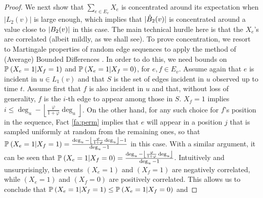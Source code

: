 \begin{proof}
We next show that $\sum_{e\in E_v}X_e$ is concentrated around its expectation when $|L_2(v)|$ is large enough, which implies that $|\hat{B}_2(v)|$ is concentrated around a value close to $|B_2(v)|$ in this case. The main technical hurdle here is that the $X_e$'s are correlated (albeit mildly, as we shall see). To prove concentration, we resort to Martingale properties of random edge sequences to apply the method of (Average) Bounded Differences \cite{dubhashi2009concentration}. In order to do this, we need bounds on $\mathbb{P}_{} \left( X_e = 1\vert X_f = 1 \right)$ and $\mathbb{P}_{} \left( X_e = 1\vert X_f = 0 \right)$, for $e, f\in E_v$. Assume again that $e$ is incident in $u\in L_1(v)$ and that $S$ is the set of edges incident in $u$ observed up to time $t$. Assume first that $f$ is also incident in $u$ and that, without loss of generality, $f$ is the $i$-th edge to appear among those in $S$. $X_f = 1$ implies $i\le\deg_u - \left\lfloor\frac{\varphi}{1 + \varphi}\deg_u\right\rfloor$. On the other hand, for any such choice for $f$'s position in the sequence, Fact \ref{fa:perm} implies that $e$ will appear in a position $j$ that is sampled uniformly at random from the remaining ones, so that $\mathbb{P}_{} \left( X_e = 1\vert X_f = 1 \right) = \frac{\deg_u - \left\lfloor\frac{\varphi}{1 + \varphi}\deg_u\right\rfloor - 1}{\deg_u - 1}$ in this case. With a similar argument, it can be seen that $\mathbb{P}_{} \left( X_e = 1\vert X_f = 0 \right) = \frac{\deg_u - \left\lfloor\frac{\varphi}{1 + \varphi}\deg_u\right\rfloor}{\deg_u - 1}$. Intuitively and unsurprisingly, the events $(X_e = 1)$ and $(X_f = 1)$ are negatively correlated, while $(X_e = 1)$ and $(X_f = 0)$ are positively correlated. This allows us to conclude that $\mathbb{P}_{} \left( X_e = 1\vert X_f = 1 \right)\le \mathbb{P}_{} \left( X_e = 1\vert X_f = 0 \right)$ and 


\end{proof}
